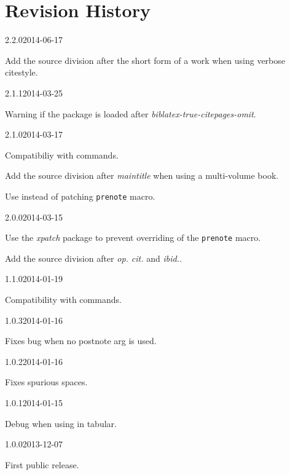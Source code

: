 \documentclass{ltxdockit}[2011/03/25]
\begin{document}
\section{Revision History}
\begin{changelog}

\begin{release}{2.2.0}{2014-06-17}
\item Add the source division after the short form of a work when using verbose citestyle.
\end{release}

\begin{release}{2.1.1}{2014-03-25}
\item Warning if the package is loaded after \emph{bibla­tex-true-citepages-omit}.
\end{release}

\begin{release}{2.1.0}{2014-03-17}
\item Compatibiliy with  commands.
\item Add the source division after \emph{maintitle} when using a multi-volume book.
\item Use  instead of patching \verb+prenote+ macro.
\end{release}


\begin{release}{2.0.0}{2014-03-15}
\item Use the \emph{xpatch} package to prevent overriding of the  \verb+prenote+ macro.
\item Add the source division after \emph{op. cit.} and \emph{ibid.}.
\end{release}


\begin{release}{1.1.0}{2014-01-19}
\item Compatibility with  commands.
\end{release}

\begin{release}{1.0.3}{2014-01-16}
\item Fixes bug when no postnote arg is used.
\end{release}

\begin{release}{1.0.2}{2014-01-16}
\item Fixes spurious spaces.
\end{release}

\begin{release}{1.0.1}{2014-01-15}
\item Debug when using in tabular.
\end{release}


\begin{release}{1.0.0}{2013-12-07}
\item First public release.
\end{release}

\end{changelog}
\end{document}
